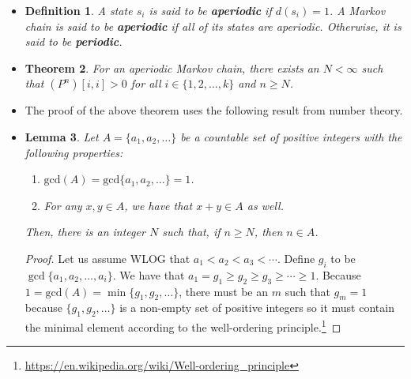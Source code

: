 \documentclass[10pt]{article}
\newtheorem{lemma}{Lemma}
\newtheorem{theorem}[lemma]{Theorem}
\newtheorem{definition}[lemma]{Definition}
\newcommand{\mrm}[1]{\mathrm{#1}}
\begin{document}
\begin{itemize}
  \item \begin{definition}
    A state $s_i$ is said to be {\bf aperiodic} if $d(s_i) = 1$. A Markov chain is said to be {\bf aperiodic} if all of its states are aperiodic. Otherwise, it is said to be {\bf periodic}.
  \end{definition}

  \item \begin{theorem} \label{theorem:aperiodic-return-prob}
    For an aperiodic Markov chain, there exists an $N < \infty$ such that $(P^n)[i,i] > 0$ for all $i \in \{1, 2, \dotsc, k\}$ and $n \geq N$.
  \end{theorem}

  \item The proof of the above theorem uses the following result from number theory.
  
  \item \begin{lemma} \label{lemma:asymptotic-integer-cover}
    Let $A = \{ a_1, a_2, \dotsc \}$ be a countable set of positive integers with the following properties:
    \begin{enumerate}
      \item $\mrm{gcd}(A) = \mrm{gcd}\{ a_1, a_2, \dotsc \} = 1$.
      \item For any $x,y \in A$, we have that $x+y \in A$ as well.
    \end{enumerate}        
    Then, there is an integer $N$ such that, if $n \geq N$, then $n \in A$.
  \end{lemma}

  \begin{proof}
    Let us assume WLOG that $a_1 < a_2 < a_3 < \dotsb$. Define $g_i$ to be $\gcd\{ a_1, a_2, \dotsc, a_i \}$. We have that $a_1 = g_1 \geq g_2 \geq g_3 \geq \dotsb \geq 1$. Because $1 = \mrm{gcd}(A) = \min\{g_1, g_2, \dotsc \}$, there must be an $m$ such that $g_m = 1$ because $\{g_1, g_2, \dotsc \}$ is a non-empty set of positive integers so it must contain the minimal element according to the well-ordering principle.\footnote{\url{https://en.wikipedia.org/wiki/Well-ordering_principle}}


\end{proof}
\end{itemize}
\end{document}
